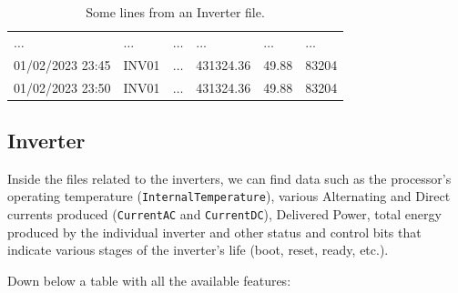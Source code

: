 \begin{table}[H]
\begin{center}
\begin{tabular}[c]{l|l|l|l|l|l}
			$\ldots$                                       &
			$\ldots$                                       &
			$\ldots$                                       &
			$\ldots$                                       &
			$\ldots$                                       &
			$\ldots$                                         \\
			01/02/2023 23:45                               &
			INV01                                          &
			$\ldots$                                       &
			431324.36                                      &
			49.88                                          &
			83204                                            \\
			01/02/2023 23:50                               &
			INV01                                          &
			$\ldots$                                       &
			431324.36                                      &
			49.88                                          &
			83204                                            \\
			\hline
		\end{tabular}
		\caption{Some lines from an Inverter file.}\label{tab:invsunto}
	\end{center}
\end{table}

\subsection{Inverter}
Inside the files related to the inverters, we can find data such as
the processor's operating temperature
(\verb|InternalTemperature|), various Alternating and Direct currents
produced (\verb|CurrentAC| and \verb|CurrentDC|), Delivered Power,
total energy produced by the individual inverter and other status
and control bits that indicate various stages of the inverter's
life (boot, reset, ready, etc.).

Down below a table with all the available features:


